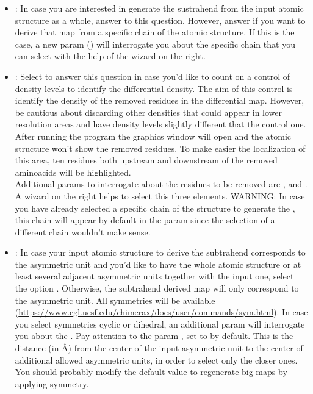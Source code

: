 \begin{itemize}
\begin{itemize}
\begin{itemize}
\begin{itemize}
            \item {}: In case you are interested in generate the sustrahend  from the input atomic structure as a whole, answer  to this question. However, answer  if you want to derive that map from a specific chain of the atomic structure. If this is the case, a new param () will interrogate you about the specific chain that you can select with the help of the wizard on the right.
            \item {}: Select  to answer this question in case you'd like to count on a control of density levels to identify the differential density. The aim of this control is identify the density of the removed residues in the differential map. However, be cautious about discarding other densities that could appear in lower resolution areas and have density levels slightly different that the control one. After running the program the \chimera graphics window will open and the atomic structure won't show the removed residues. To make easier the localization of this area, ten residues both upstream and downstream of the removed aminoacids will be highlighted.\\
            Additional params to interrogate about the residues to be removed are ,  and . A wizard on the right helps to select this three elements. WARNING: In case you have already selected a specific chain of the structure to generate the , this chain will appear by default in the param  since the selection of a different chain wouldn't make sense.
            \item {}: In case your input atomic structure to derive the subtrahend  corresponds to the asymmetric unit and you'd like to have the whole atomic structure or at least several adjacent asymmetric units together with the input one, select the option . Otherwise, the subtrahend derived map will only correspond to the asymmetric unit. All \chimera symmetries will be available (\url{https://www.cgl.ucsf.edu/chimerax/docs/user/commands/sym.html}). In case you select symmetries cyclic or dihedral, an additional param will interrogate you about the . Pay attention to the param , set to  by default. This is the distance (in \AA) from the center of the input asymmetric unit to the center of additional allowed asymmetric units, in order to select only the closer ones. You should probably modify the default value to regenerate big maps by applying symmetry.

\end{itemize}
\end{itemize}
\end{itemize}
\end{itemize}
